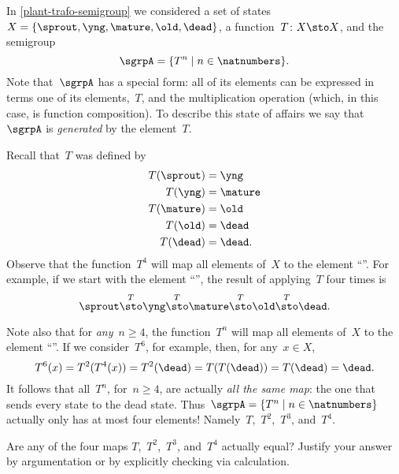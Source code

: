 

\section{}


In \cref{plant-trafo-semigroup} we considered a set of states~$X = \{ \sprout, \yng, \mature, \old, \dead \}$, a function~$T\colon X \sto X$, and the semigroup
\begin{equation}\label{trafo-sgrp-one-gen}
\sgrpA = \{ T^n \mid n \in \natnumbers \}.
\end{equation}
Note that~$\sgrpA$ has a special form: all of its elements can be expressed in terms one of its elements,~$T$, and the multiplication operation (which, in this case, is function composition).
To describe this state of affairs we say that~$\sgrpA$ is \emph{generated} by the element~$T$.


Recall that~$T$ was defined by
\begin{align*}
T(\sprout) &=  \yng \\
T(\yng) &=  \mature \\
T(\mature) &=  \old \\
T( \old) &= \dead \\
T (\dead) &= \dead.
\end{align*}
Observe that the function~$T^4$ will map all elements of~$X$ to the element ``\dead''. For example, if we start with the element ``\sprout'', the result of applying~$T$ four times is
\begin{equation*}
\sprout \overset{T}{\sto} \yng \overset{T}{\sto} \mature \overset{T}{\sto} \old \overset{T}{\sto} \dead.
\end{equation*}

Note also that for \emph{any}~$n \geq 4$, the function~$T^n$ will map all elements of~$X$ to the element ``\dead''.
If we consider~$T^6$, for example, then, for any~$x \in X$,
\begin{equation*}
T^6(x) = T^2(T^4(x)) = T^2(\dead) = T(T(\dead)) = T(\dead) = \dead.
\end{equation*}
It follows that all~$T^n$, for~$n \geq 4$, are actually \emph{all the same map}: the one that sends every state to the dead state.
Thus~$\sgrpA = \{ T^n \mid n \in \natnumbers \}$ actually only has at most four elements! Namely~$T$,~$T^2$,~$T^3$, and~$T^4$.

\begin{gradedexercise}
Are any of the four maps $T$,~$T^2$,~$T^3$, and~$T^4$ actually equal? Justify your answer by argumentation or by explicitly checking via calculation. 
\end{gradedexercise}

